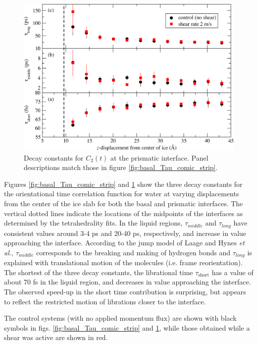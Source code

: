 \begin{figure}
\includegraphics[width=\linewidth]{Figures/prismatic_Tau_comic_strip}
\caption{\label{fig:prismatic_Tau_comic_strip}
 Decay constants for $C_2(t)$ at the prismatic interface.  Panel
  descriptions match those in figure \ref{fig:basal_Tau_comic_strip}.}
\end{figure}

Figures \ref{fig:basal_Tau_comic_strip} and
\ref{fig:prismatic_Tau_comic_strip} show the three decay constants for
the orientational time correlation function for water at varying
displacements from the center of the ice slab for both the basal and
prismatic interfaces.  The vertical dotted lines indicate the
locations of the midpoints of the interfaces as determined by the
tetrahedrality fits. In the liquid regions, $\tau_{middle}$ and
$\tau_{long}$ have consistent values around 3-4 ps and 20-40 ps,
respectively, and increase in value approaching the interface.
According to the jump model of Laage and Hynes {\em et
  al.},\cite{Laage08,Laage11} $\tau_{middle}$ corresponds to the
breaking and making of hydrogen bonds and $\tau_{long}$ is explained
with translational motion of the molecules (i.e. frame reorientation).
The shortest of the three decay constants, the librational time
$\tau_\mathrm{short}$ has a value of about 70 fs in the liquid region,
and decreases in value approaching the interface. The observed
speed-up in the short time contribution is surprising, but appears to
reflect the restricted motion of librations closer to the interface.

The control systems (with no applied momentum flux) are shown with
black symbols in figs. \ref{fig:basal_Tau_comic_strip} and
\ref{fig:prismatic_Tau_comic_strip}, while those obtained while a
shear was active are shown in red.

